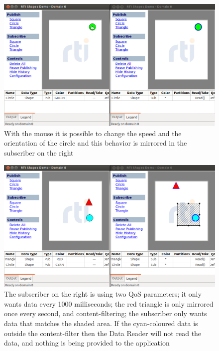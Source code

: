 \documentclass[Main]{subfiles}
\begin{document}
\vspace{10 pt}
\begin{figure}[H]
\centering
\includegraphics[scale=0.5]{Figure/SDhold.png}
\caption{With the mouse it is possible to change the speed and the orientation of the circle and this behavior is mirrored in the subscriber on the right}
\end{figure}
\vspace{10 pt}
\begin{figure}[H]
\centering
\includegraphics[scale=0.5]{Figure/SDwContentAndTimeFiltering.png}
\caption{The subscriber on the right is using two QoS parameters; it only wants data every 1000 milliseconds; the red triangle is only mirrored once every second, and content-filtering; the subscriber only wants data that matches the shaded area. If the cyan-coloured data is outside the content-filter then the Data Reader will not read the data, and nothing is being provided to the application}
\end{figure}
\vspace{10 pt}
\end{document}
